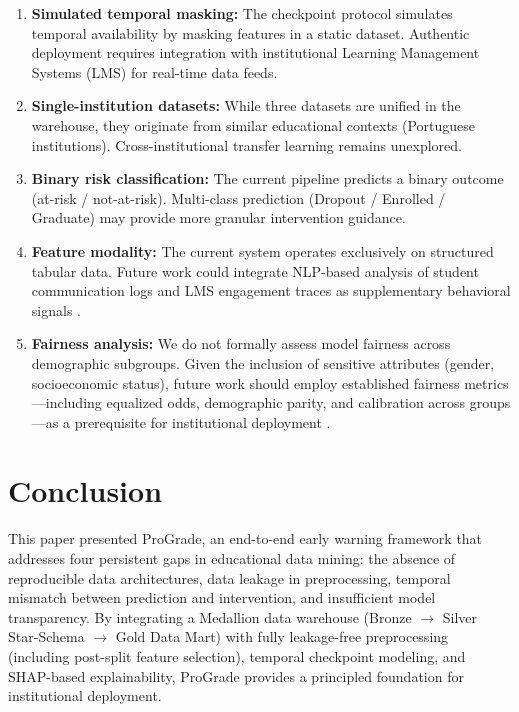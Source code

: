 \documentclass[conference,a4paper]{IEEEtran}
\begin{document}
\begin{enumerate}[leftmargin=*, label=\arabic*)]
\item \textbf{Simulated temporal masking:} The checkpoint protocol simulates temporal availability by masking features in a static dataset. Authentic deployment requires integration with institutional Learning Management Systems (LMS) for real-time data feeds.

\item \textbf{Single-institution datasets:} While three datasets are unified in the warehouse, they originate from similar educational contexts (Portuguese institutions). Cross-institutional transfer learning \cite{gardner2023crossinstitutional} remains unexplored.

\item \textbf{Binary risk classification:} The current pipeline predicts a binary outcome (at-risk / not-at-risk). Multi-class prediction (Dropout / Enrolled / Graduate) \cite{martins2023phased} may provide more granular intervention guidance.

\item \textbf{Feature modality:} The current system operates exclusively on structured tabular data. Future work could integrate NLP-based analysis of student communication logs and LMS engagement traces as supplementary behavioral signals \cite{chen2022deep}.

\item \textbf{Fairness analysis:} We do not formally assess model fairness across demographic subgroups. Given the inclusion of sensitive attributes (gender, socioeconomic status), future work should employ established fairness metrics---including equalized odds, demographic parity, and calibration across groups---as a prerequisite for institutional deployment \cite{gardner2023crossinstitutional}.
\end{enumerate}

\section{Conclusion}\label{sec:conclusion}

This paper presented ProGrade, an end-to-end early warning framework that addresses four persistent gaps in educational data mining: the absence of reproducible data architectures, data leakage in preprocessing, temporal mismatch between prediction and intervention, and insufficient model transparency. By integrating a Medallion data warehouse (Bronze $\rightarrow$ Silver Star-Schema $\rightarrow$ Gold Data Mart) with fully leakage-free preprocessing (including post-split feature selection), temporal checkpoint modeling, and SHAP-based explainability, ProGrade provides a principled foundation for institutional deployment.
\end{document}
